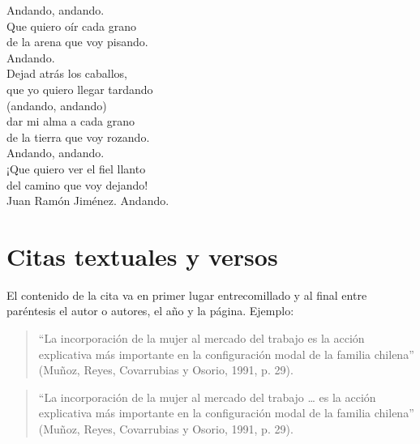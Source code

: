 \documentclass[11pt,a4paper]{report}
\begin{document}
\begin{flushleft}
Andando, andando. \\
Que quiero oír cada grano \\
de la arena que voy pisando. \\

Andando. \\
Dejad atrás los caballos, \\
que yo quiero llegar tardando \\
(andando, andando)  \\
dar mi alma a cada grano \\
de la tierra que voy rozando.\\

Andando, andando. \\
¡Que quiero ver el fiel llanto\\
del camino que voy dejando!\\

Juan Ramón Jiménez. Andando.\\
\end{flushleft}


\section{Citas textuales y versos}


El contenido de la cita va en primer lugar entrecomillado 
y al final entre paréntesis el autor o autores, el año y la página. 
Ejemplo:

\begin{quote}
``La incorporación de la mujer al mercado del trabajo
es la acción explicativa más importante en la configuración 
modal de la familia chilena''
(Muñoz, Reyes, Covarrubias y Osorio, 1991, p. 29).
\end{quote}


\begin{quotation}
``La incorporación de la mujer al mercado del trabajo \dots{}
es la acción explicativa más importante en la configuración 
modal de la familia chilena''
(Muñoz, Reyes, Covarrubias y Osorio, 1991, p. 29).
\end{quotation}
\end{document}
